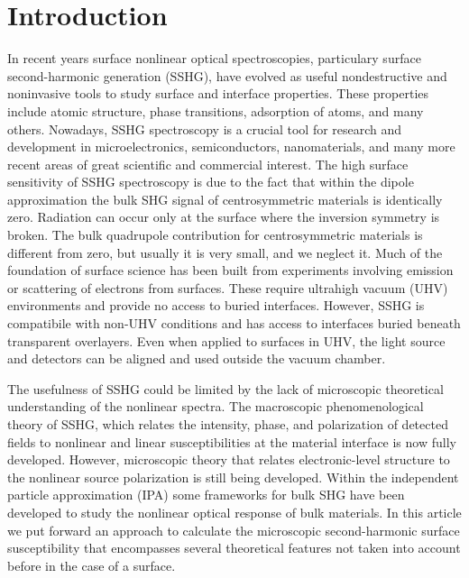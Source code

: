 \documentclass[floatfix,prb,aps,superscriptaddress,showpacs,11pt,preprint,letterpaper]{revtex4}
\begin{document}
\maketitle

\section{Introduction}\label{intro}

In recent years surface nonlinear optical spectroscopies, particulary surface 
second-harmonic generation (SSHG), have evolved as useful nondestructive 
and noninvasive tools to study surface and interface properties. These 
properties include atomic structure, phase transitions, adsorption of 
atoms, and many others.\cite{daumPRL93, mcgilpOE94, meyerPRL95, powerPRL95, 
godefroyAPL96, hoferAPA96, dadapPRB97, bloembergenAPB99, mcgilpSRL99, 
suzukiAPB99, mitchellSS01, hughesPRB96, guyotPRB88, downerPSSA01, shenAPB99, 
shenNAT89, chenPRL81, mendozaPRL98, downerSIA01} Nowadays, SSHG spectroscopy 
is a crucial tool for research and development in microelectronics,
\cite{zheltikovLP00} semiconductors, \cite{lupkeSSR99} nanomaterials,
\cite{salazar-aparicioPRB14} and many more recent areas of great scientific 
and commercial interest.\cite{cazzanelliNM14} The high surface sensitivity 
of SSHG spectroscopy is due to the fact that within the dipole approximation 
the bulk SHG signal of centrosymmetric materials is identically zero.
Radiation can occur only at the surface where the inversion symmetry is 
broken. 
The bulk quadrupole contribution for centrosymmetric materials is
different from zero, but usually it is very small,\cite{downerSIA01} and we neglect it. 
Much of the foundation of surface science has been built from 
experiments involving emission or scattering of electrons from surfaces. 
These require ultrahigh vacuum (UHV) environments and provide no access to 
buried interfaces. However, SSHG is compatibile with non-UHV conditions and 
has access to interfaces buried beneath transparent overlayers. Even when 
applied to surfaces in UHV, the light source and detectors can be aligned and
used outside the vacuum chamber. 

The usefulness of SSHG could be limited by the lack of microscopic theoretical
understanding of the nonlinear spectra. The macroscopic phenomenological 
theory of SSHG, which relates the intensity, phase, and polarization of 
detected fields to nonlinear and linear susceptibilities at the material 
interface is now fully developed.\cite{downerSIA01}
 However, microscopic theory that relates 
electronic-level structure to the nonlinear source polarization is still being 
developed. \cite{butcherPOPS63, aspnesPRB72, sipePRB93,
  levinePRB94,aversaPRB95, hughesPRB96, rashkeevPRB98,beyond}  
 Within the independent 
particle approximation (IPA) some frameworks for bulk SHG have been developed 
to study the nonlinear optical response of bulk materials. \cite{butcherPOPS63, aspnesPRB72, sipePRB93, levinePRB94,aversaPRB95, hughesPRB96, rashkeevPRB98} 
In this article we put forward an approach to calculate the
microscopic second-harmonic surface susceptibility that encompasses several
theoretical features not taken into account before 
in the case of a surface.
\end{document}
